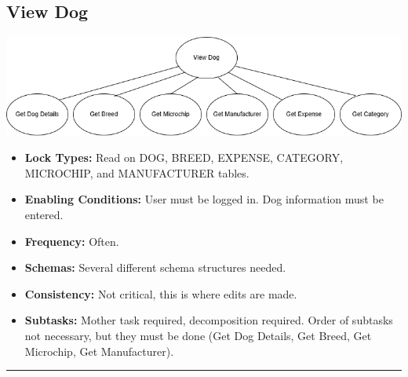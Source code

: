 \documentclass{article}
\begin{document}
\subsection{View Dog}
\begin{center}
    \includegraphics[width=0.8\linewidth]{task1_diagram.png}
\end{center}
\begin{itemize}
    \item \textbf{Lock Types:} Read on DOG, BREED, EXPENSE, CATEGORY, MICROCHIP, and MANUFACTURER tables.
    \item \textbf{Enabling Conditions:} User must be logged in. Dog information must be entered.
    \item \textbf{Frequency:} Often.
    \item \textbf{Schemas:} Several different schema structures needed.
    \item \textbf{Consistency:} Not critical, this is where edits are made.
    \item \textbf{Subtasks:} Mother task required, decomposition required. Order of subtasks not necessary, but they must be done (Get Dog Details, Get Breed, Get Microchip, Get Manufacturer).
\end{itemize}
\noindent\rule{8cm}{0.4pt}
\end{document}
